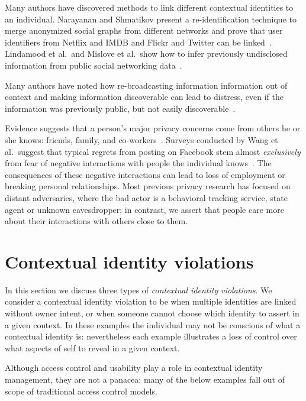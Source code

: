 \documentclass[10pt, conference, compsocconf]{IEEEtran}
\begin{document}
Many authors have discovered methods to link different contextual identities to
an individual. Narayanan and Shmatikov present a re-identification technique
to merge anonymized social graphs from different networks and prove that
user identifiers from Netflix and IMDB and Flickr and Twitter can be
linked~\cite{narayanan1,narayanan2}. Lindamood et al.~and Mislove et al.~show
how to infer previously undisclosed information from public social networking
data~\cite{lindamood,mislove}.

Many authors have noted how re-broadcasting information information out of
context and making information discoverable can lead to distress, even if
the information was previously public, but not easily
discoverable~\cite{boyd1,chew,nissenbaum}.

Evidence suggests that a person's major privacy concerns come from others he or she
knows: friends, family, and co-workers~\cite{fbtips2,fbtips1}.  Surveys
conducted by Wang et al.~suggest that typical regrets from posting on Facebook
stem almost {\em exclusively} from fear of negative interactions with people the individual knows~\cite{wang}. The consequences of these negative interactions can
lead to loss of employment or breaking personal relationships.  Most previous
privacy research has focused on distant adversaries, where the bad actor is a
behavioral tracking service, state agent or unknown eavesdropper; in contrast,
we assert that people care more about their interactions with others close to
them.

\section{Contextual identity violations}
In this section we discuss three types of \textit{contextual identity
violations}. We consider a contextual identity violation to be when multiple
identities are linked without owner intent, or when someone cannot choose which
identity to assert in a given context. In these examples the individual
may not be conscious of what a contextual identity is: nevertheless each
example illustrates a loss of control over what aspects of self to
reveal in a given context.

Although access control and usability play a role in contextual identity
management, they are not a panacea: many of the below examples fall out of
scope of traditional access control models.

\label{sec:examples}
\end{document}
